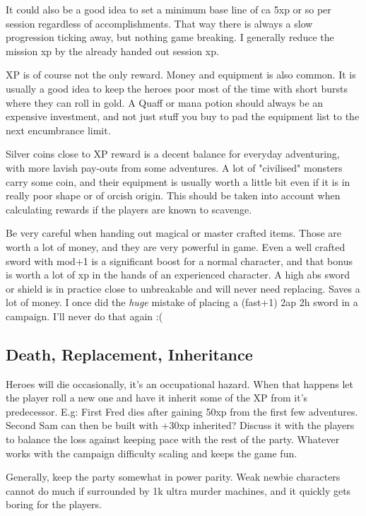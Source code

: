 It could also be a good idea to set a minimum base line of ca 5xp or so per session regardless of accomplishments. That way there is always a slow progression ticking away, but nothing game breaking. I generally reduce the mission xp by the already handed out session xp.

XP is of course not the only reward. Money and equipment is also common. It is usually a good idea to keep the heroes poor most of the time with short bursts where they can roll in gold. A Quaff or mana potion should always be an expensive investment, and not just stuff you buy to pad the equipment list to the next encumbrance limit.

Silver coins close to XP reward is a decent balance for everyday adventuring, with more lavish pay-outs from some adventures. A lot of "civilised" monsters carry some coin, and their equipment is usually worth a little bit even if it is in really poor shape or of orcish origin. This should be taken into account when calculating rewards if the players are known to scavenge.

Be very careful when handing out magical or master crafted items. Those are worth a lot of money, and they are very powerful in game. Even a well crafted sword with mod+1 is a significant boost for a normal character, and that bonus is worth a lot of xp in the hands of an experienced character. A high abs sword or shield is in practice close to unbreakable and will never need replacing. Saves a lot of money.
I once did the \emph{huge} mistake of placing a (fast+1) 2ap 2h sword in a campaign. I'll never do that again :(


\subsection*{Death, Replacement, Inheritance}
Heroes will die occasionally, it's an occupational hazard. When that happens let the player roll a new one and have it inherit some of the XP from it's predecessor. E.g: First Fred dies after gaining 50xp from the first few adventures. Second Sam can then be built with +30xp inherited? Discuss it with the players to balance the loss against keeping pace with the rest of the party. Whatever works with the campaign difficulty scaling and keeps the game fun.

Generally, keep the party somewhat in power parity. Weak newbie characters cannot do much if surrounded by 1k ultra murder machines, and it quickly gets boring for the players.


